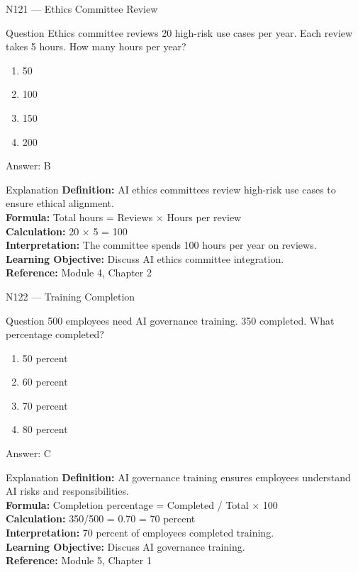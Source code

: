 \documentclass[aspectratio=169,8pt]{beamer}
\begin{document}
	\begin{frame}{N121 --- Ethics Committee Review}
		\begin{block}{Question}
			Ethics committee reviews 20 high-risk use cases per year. Each review takes 5 hours. How many hours per year?
			\begin{enumerate}
				\item 50
				\item 100
				\item 150
				\item 200
			\end{enumerate}
		\end{block}
		\begin{exampleblock}{Answer: B}\end{exampleblock}
		\begin{block}{Explanation}
			\textbf{Definition:} AI ethics committees review high-risk use cases to ensure ethical alignment.\\
			\textbf{Formula:} Total hours = Reviews $\times$ Hours per review\\
			\textbf{Calculation:} 20 $\times$ 5 = 100\\
			\textbf{Interpretation:} The committee spends 100 hours per year on reviews.\\
			\textbf{Learning Objective:} Discuss AI ethics committee integration.\\
			\textbf{Reference:} Module 4, Chapter 2
		\end{block}
	\end{frame}
	
	\begin{frame}{N122 --- Training Completion}
		\begin{block}{Question}
			500 employees need AI governance training. 350 completed. What percentage completed?
			\begin{enumerate}
				\item 50 percent
				\item 60 percent
				\item 70 percent
				\item 80 percent
			\end{enumerate}
		\end{block}
		\begin{exampleblock}{Answer: C}\end{exampleblock}
		\begin{block}{Explanation}
			\textbf{Definition:} AI governance training ensures employees understand AI risks and responsibilities.\\
			\textbf{Formula:} Completion percentage = Completed / Total $\times$ 100\\
			\textbf{Calculation:} 350/500 = 0.70 = 70 percent\\
			\textbf{Interpretation:} 70 percent of employees completed training.\\
			\textbf{Learning Objective:} Discuss AI governance training.\\
			\textbf{Reference:} Module 5, Chapter 1
		\end{block}
	\end{frame}
	
\end{document}
